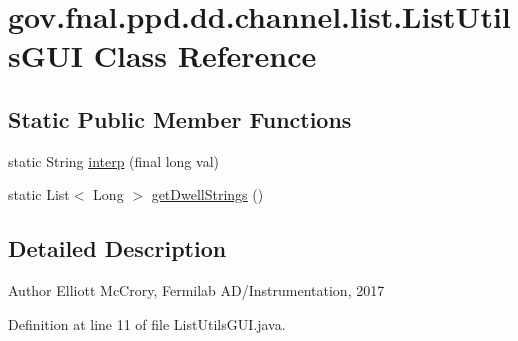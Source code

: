 \hypertarget{classgov_1_1fnal_1_1ppd_1_1dd_1_1channel_1_1list_1_1ListUtilsGUI}{\section{gov.\-fnal.\-ppd.\-dd.\-channel.\-list.\-List\-Utils\-G\-U\-I Class Reference}
\label{classgov_1_1fnal_1_1ppd_1_1dd_1_1channel_1_1list_1_1ListUtilsGUI}
}
\subsection*{Static Public Member Functions}
\begin{DoxyCompactItemize}
\item 
static String \hyperlink{classgov_1_1fnal_1_1ppd_1_1dd_1_1channel_1_1list_1_1ListUtilsGUI_a74040be8d5ff5ec79cf33db62e1ee673}{interp} (final long val)
\item 
static List$<$ Long $>$ \hyperlink{classgov_1_1fnal_1_1ppd_1_1dd_1_1channel_1_1list_1_1ListUtilsGUI_acf82b25a88214152cebb51e1d9ae2bb1}{get\-Dwell\-Strings} ()
\end{DoxyCompactItemize}


\subsection{Detailed Description}
\begin{DoxyAuthor}{Author}
Elliott Mc\-Crory, Fermilab A\-D/\-Instrumentation, 2017 
\end{DoxyAuthor}


Definition at line 11 of file List\-Utils\-G\-U\-I.\-java.



